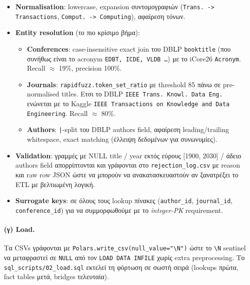 \begin{itemize}
    \item \textbf{Normalisation}: lowercase, expansion συντομογραφιών
          (\texttt{Trans. -> Transactions}, \texttt{Comput. -> Computing}),
          αφαίρεση τόνων.
    \item \textbf{Entity resolution} (το πιο κρίσιμο βήμα):
          \begin{itemize}
              \item \textbf{Conferences}: case-insensitive exact join του
                    DBLP \texttt{booktitle} (που συνήθως είναι το acronym
                    \texttt{EDBT, ICDE, VLDB \dots}) με το iCore26 \texttt{Acronym}.
                    Recall \(\approx\) 19\%, precision 100\%.
              \item \textbf{Journals}: \texttt{rapidfuzz.token\_set\_ratio} με
                    threshold 85 πάνω σε pre-normalised titles. Ετσι το
                    DBLP \texttt{IEEE Trans. Knowl. Data Eng.} ενώνεται με
                    το Kaggle \texttt{IEEE Transactions on Knowledge and
                    Data Engineering}. Recall \(\approx\) 80\%.
              \item \textbf{Authors}: \texttt{|}-split του DBLP authors
                    field, αφαίρεση leading/trailing whitespace, exact
                    matching (έλλειψη δεδομένων για συνωνυμίες).
          \end{itemize}
    \item \textbf{Validation}: γραμμές με NULL title / year εκτός εύρους
          [1900, 2030] / άδειο authors field απορρίπτονται και γράφονται
          στο \texttt{rejection\_log.csv} με reason και raw row JSON
          ώστε να μπορούν να ανακατασκευαστούν αν ξανατρέξει το ETL με
          βελτιωμένη λογική.
    \item \textbf{Surrogate keys}: σε όλους τους lookup πίνακες
          (\texttt{author\_id}, \texttt{journal\_id}, \texttt{conference\_id})
          για να συμμορφωθούμε με το \emph{integer-PK} requirement.
\end{itemize}

\paragraph{(γ) Load.} Τα CSVs γράφονται με
\texttt{Polars.write\_csv(null\_value="\textbackslash N")} ώστε το \texttt{\textbackslash N}
sentinel να μεταφραστεί σε \texttt{NULL} από τον \texttt{LOAD DATA INFILE} χωρίς
extra preprocessing. Το \texttt{sql\_scripts/02\_load.sql} εκτελεί τη φόρτωση σε
σωστή σειρά (lookups πρώτα, fact tables μετά, bridges τελευταία).


